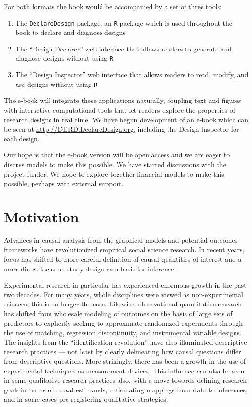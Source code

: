 \documentclass[11pt]{article}
\begin{document}
For both formats the book would be accompanied by a set of three tools:

\begin{enumerate}
\item The \texttt{DeclareDesign} package, an \texttt{R}  package which is used throughout the book to declare and diagnose designs
\item The ``Design Declarer'' web interface that allows readers to generate and diagnose designs without using  \texttt{R}  
\item The ``Design Inspector'' web interface that allows readers to read, modify, and use designs without using  \texttt{R}  
\end{enumerate}

The e-book will integrate these applications naturally, coupling text and figures with interactive computational tools that let readers explore the properties of research designs in real time. We have begun development of an e-book which can be seen at \url{http://DDRD.DeclareDesign.org}, including the Design Inspector for each design.

Our hope is that the e-book version will be open access and we are eager to discuss models to make this possible. We have started discussions with the project funder. We hope to explore together financial models to make this possible, perhaps with external support. 

\section{Motivation}

Advances in causal analysis from the graphical models and potential outcomes frameworks have revolutionized empirical social science research. In recent years, focus has shifted to more careful definition of causal quantities of interest and a more direct focus on study design as a basis for inference.

Experimental research in particular has experienced enormous growth in the past two decades. For many years, whole disciplines were viewed as non-experimental sciences; this is no longer the case. Likewise, observational quantitative research has shifted from wholesale modeling of outcomes on the basis of large sets of predictors to explicitly seeking to approximate randomized experiments through the use of matching, regression discontinuity, and instrumental variable designs. The insights from the ``identification revolution'' have also illuminated descriptive research practices --- not least by clearly delineating how causal questions differ from descriptive questions. More strikingly, there has been a growth in the use of experimental techniques as measurement devices. This influence can also be seen in some qualitative research practices also, with a move towards defining research goals in terms of causal estimands, articulating mappings from data to inferences, and in some cases pre-registering qualitative strategies. 
\end{document}
